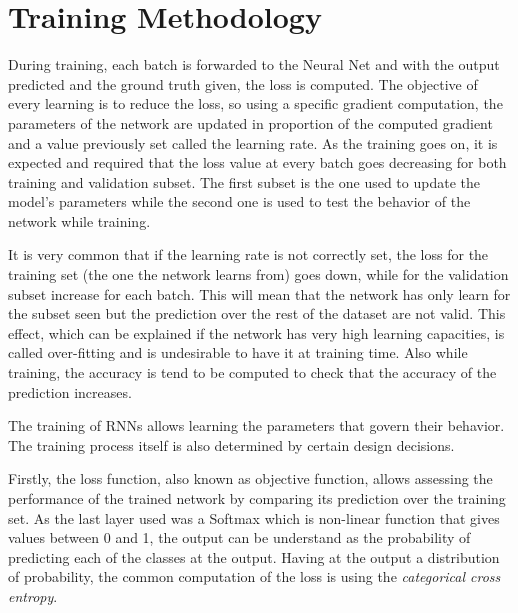

\section{Training Methodology}
\label{section:training}

During training, each batch is forwarded to the Neural Net and with the output predicted and the ground truth given, the loss is computed. The objective of every learning is to reduce the loss, so using a specific gradient computation, the parameters of the network are updated in proportion of the computed gradient and a value previously set called the learning rate. As the training goes on, it is expected and required that the loss value at every batch goes decreasing for both training and validation subset. The first subset is the one used to update the model's parameters while the second one is used to test the behavior of the network while training.

It is very common that if the learning rate is not correctly set, the loss for the training set (the one the network learns from) goes down, while for the validation subset increase for each batch. This will mean that the network has only learn for the subset seen but the prediction over the rest of the dataset are not valid. This effect, which can be explained if the network has very high learning capacities, is called over-fitting and is undesirable to have it at training time. Also while training, the accuracy is tend to be computed to check that the accuracy of the prediction increases.

The training of RNNs allows learning the parameters that govern their behavior. The training process itself is also determined by certain design decisions.

Firstly, the loss function, also known as objective function, allows assessing the performance of the trained network by comparing its prediction over the training set. As the last layer used was a Softmax which is non-linear function that gives values between 0 and 1, the output can be understand as the probability of predicting each of the classes at the output. Having at the output a distribution of probability, the common computation of the loss is using the \textit{categorical cross entropy}. 

